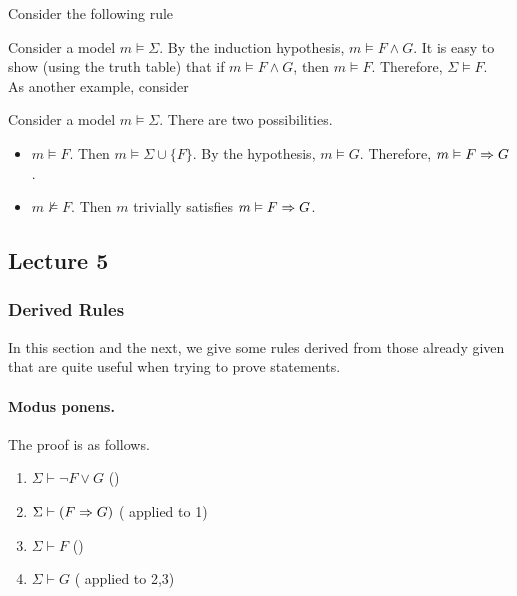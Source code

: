 Consider the following rule
\begin{prooftree}
\end{prooftree}
Consider a model $m\vDash\Sigma$. By the induction hypothesis, $m\vDash F\wedge G$. It is easy to show (using the truth table) that if $m\vDash F\wedge G$, then $m\vDash F$. Therefore, $\Sigma\vDash F$.\\

As another example, consider
\begin{prooftree}
\end{prooftree}
Consider a model $m\vDash\Sigma$. There are two possibilities.
\begin{itemize}
    \item $m\vDash F$. Then $m\vDash \Sigma\cup\{F\}$. By the hypothesis, $m\vDash G$. Therefore, $m\vDash F\imp G$.
    \item $m\nvDash F$. Then $m$ trivially satisfies $m\vDash F\imp G$.
\end{itemize}

\subsection{Lecture 5}

\subsubsection{Derived Rules}

In this section and the next, we give some rules derived from those already given that are quite useful when trying to prove statements.

\paragraph{Modus ponens.} %
\begin{prooftree}
\end{prooftree}
The proof is as follows.
\begin{enumerate}
    \item $\Sigma\vdash\neg F\vee G$ \hfill ()
    \item $\Sigma\vdash (F\imp G)$ \hfill ( applied to 1)
    \item $\Sigma\vdash F$ \hfill ()
    \item $\Sigma\vdash G$ \hfill ( applied to 2,3) 
\end{enumerate}

